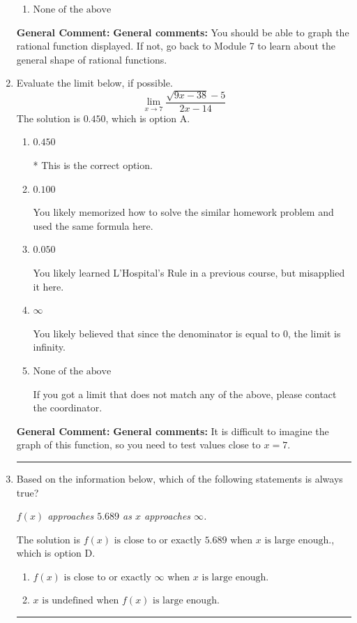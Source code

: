 \documentclass{extbook}[14pt]
\newcommand{\litem}[1]{\item #1

\rule{\textwidth}{0.4pt}}
\begin{document}
\begin{enumerate}
{\begin{enumerate}[label=\Alph*.]
\item \( \text{None of the above} \)


\end{enumerate}

\textbf{General Comment:} \textbf{General comments:} You should be able to graph the rational function displayed. If not, go back to Module 7 to learn about the general shape of rational functions.
}
\litem{
Evaluate the limit below, if possible.
\[ \lim_{x \rightarrow 7} \frac{\sqrt{9x - 38} - 5}{2x - 14} \]The solution is \( 0.450 \), which is option A.\begin{enumerate}[label=\Alph*.]
\item \( 0.450 \)

* This is the correct option.
\item \( 0.100 \)

You likely memorized how to solve the similar homework problem and used the same formula here.
\item \( 0.050 \)

You likely learned L'Hospital's Rule in a previous course, but misapplied it here.
\item \( \infty \)

You likely believed that since the denominator is equal to 0, the limit is infinity.
\item \( \text{None of the above} \)

If you got a limit that does not match any of the above, please contact the coordinator.
\end{enumerate}

\textbf{General Comment:} \textbf{General comments:} It is difficult to imagine the graph of this function, so you need to test values close to $x = 7$.
}
\litem{
Based on the information below, which of the following statements is always true?

\begin{center}
    \textit{ $f(x)$ approaches $5.689$ as $x$ approaches $\infty$. }
\end{center}
The solution is \( f(x) \text{ is close to or exactly } 5.689 \text{ when } x \text{ is large enough}. \), which is option D.\begin{enumerate}[label=\Alph*.]
\item \( f(x) \text{ is close to or exactly } \infty \text{ when } x \text{ is large enough}. \)


\item \( x \text{ is undefined when } f(x) \text{ is large enough}. \)



\end{enumerate}}
\end{enumerate}
\end{document}
